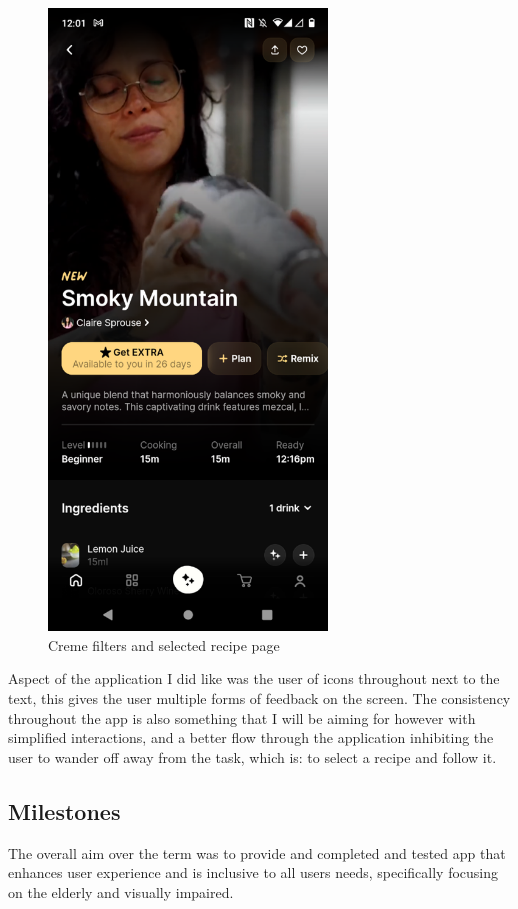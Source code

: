 \documentclass[]{project_final}
\begin{document}
\begin{figure}[ht!]
\begin{minipage}[t]{0.4\textwidth}
        \includegraphics[width=20em]{cremeImage4.png}
    \end{minipage}
    \caption{Creme filters and selected recipe page}
    \label{fig:1}
\end{figure}

Aspect of the application I did like was the user of icons throughout next to the text, this gives the user multiple forms of feedback on the screen. The consistency throughout the app is also something that I will be aiming for however with simplified interactions, and a better flow through the application inhibiting the user to wander off away from the task, which is: to select a recipe and follow it.

\subsection{Milestones}
The overall aim over the term was to provide and completed and tested app that enhances user experience and is inclusive to all users needs, specifically focusing on the elderly and visually impaired.
\end{document}
